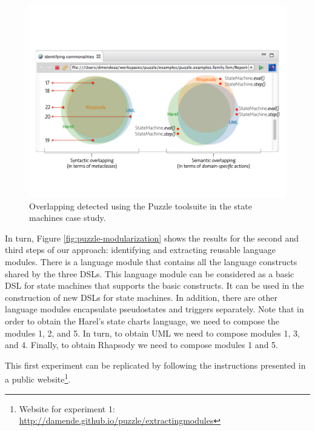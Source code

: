 \begin{figure}
\centering
\includegraphics[width=1\linewidth]{images/puzzle-overlapping.pdf}
\caption{Overlapping detected using the Puzzle toolsuite in the state machines case study. }
\label{fig:puzzle-overlapping}
\end{figure}

In turn, Figure \ref{fig:puzzle-modularization} shows the results for the second and third steps of our approach: identifying and extracting reusable language modules. There is a language module that contains all the language constructs shared by the three DSLs. This language module can be considered as a basic DSL for state machines that supports the basic constructs. It can be used in the construction of new DSLs for state machines. In addition, there are other language modules encapsulate pseudostates and triggers separately. Note that in order to obtain the Harel's state charts language, we need to compose the modules 1, 2, and 5. In turn, to obtain UML we need to compose modules 1, 3, and 4. Finally, to obtain Rhapsody we need to compose modules 1 and 5.

This first experiment can be replicated by following the instructions presented in a public website\footnote{Website for experiment 1: \url{http://damende.github.io/puzzle/extractingmodules}}. 

